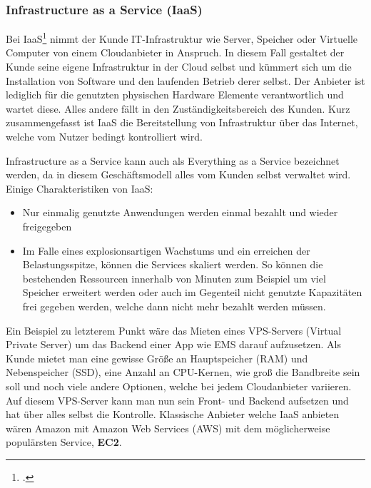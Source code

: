 \subsubsection{Infrastructure as  a Service (IaaS)}
Bei IaaS\footcite{cloud-ms} nimmt der Kunde IT-Infrastruktur wie Server, Speicher oder Virtuelle Computer von einem Cloudanbieter in Anspruch. In diesem Fall gestaltet der Kunde seine eigene Infrastruktur in der Cloud selbst und kümmert sich um die Installation von Software und den laufenden Betrieb derer selbst. Der Anbieter ist lediglich für die genutzten physischen Hardware Elemente verantwortlich und wartet diese. Alles andere fällt in den Zuständigkeitsbereich des Kunden. Kurz zusammengefasst ist IaaS die Bereitstellung von Infrastruktur über das Internet, welche vom Nutzer bedingt kontrolliert wird. \newline

Infrastructure as a Service kann auch als Everything as a Service bezeichnet werden, da in diesem Geschäftsmodell alles vom Kunden selbst verwaltet wird. Einige Charakteristiken von IaaS:
\begin{itemize}
	\item Nur einmalig genutzte Anwendungen werden einmal bezahlt und wieder freigegeben
	\item Im Falle eines explosionsartigen Wachstums und ein erreichen der Belastungsspitze, können die Services skaliert werden. So können die bestehenden Ressourcen innerhalb von Minuten zum Beispiel um viel Speicher erweitert werden oder auch im Gegenteil nicht genutzte Kapazitäten frei gegeben werden, welche dann nicht mehr bezahlt werden müssen.
\end{itemize}

Ein Beispiel zu letzterem Punkt wäre das Mieten eines VPS-Servers (Virtual Private Server) um das Backend einer App wie EMS darauf aufzusetzen.
Als Kunde mietet man eine gewisse Größe an Hauptspeicher (RAM) und Nebenspeicher (SSD), eine Anzahl an CPU-Kernen, wie groß die 
Bandbreite sein soll und noch viele andere Optionen, welche bei jedem Cloudanbieter variieren. 
Auf diesem VPS-Server kann man nun sein Front- und Backend aufsetzen und hat über alles selbst die Kontrolle.
Klassische Anbieter welche IaaS anbieten wären Amazon mit Amazon Web Services (AWS) mit dem möglicherweise populärsten Service, \textbf{EC2}.

